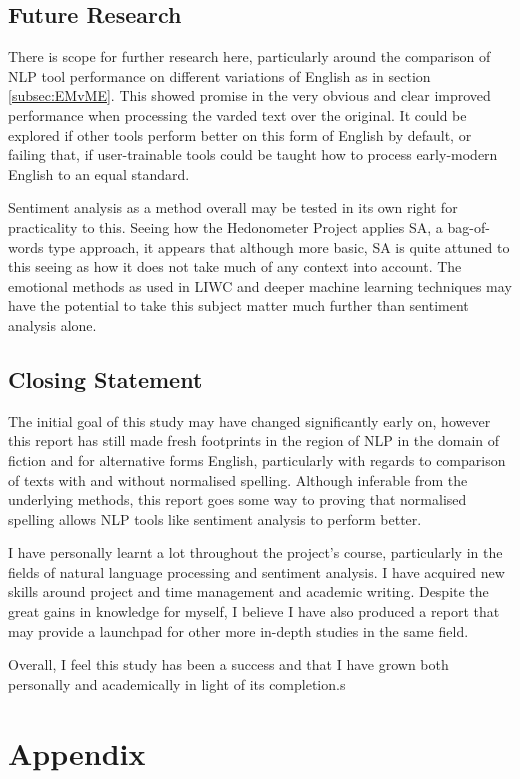 \documentclass{article}
\begin{document}
{    \subsection{Future Research}
        There is scope for further research here, particularly around the comparison of NLP tool performance on different variations of English as in section \ref{subsec:EMvME}. This showed promise in the very obvious and clear improved performance when processing the varded text over the original. It could be explored if other tools perform better on this form of English by default, or failing that, if user-trainable tools could be taught how to process early-modern English to an equal standard.

        Sentiment analysis as a method overall may be tested in its own right for practicality to this. Seeing how the Hedonometer Project applies SA, a bag-of-words type approach, it appears that although more basic, SA is quite attuned to this seeing as how it does not take much of any context into account. The emotional methods as used in LIWC and deeper machine learning techniques may have the potential to take this subject matter much further than sentiment analysis alone.
    \subsection{Closing Statement}
        The initial goal of this study may have changed significantly early on, however this report has still made fresh footprints in the region of NLP in the domain of fiction and for alternative forms English, particularly with regards to comparison of texts with and without normalised spelling. Although inferable from the underlying methods, this report goes some way to proving that normalised spelling allows NLP tools like sentiment analysis to perform better.

        I have personally learnt a lot throughout the project's course, particularly in the fields of natural language processing and sentiment analysis. I have acquired new skills around project and time management and academic writing. Despite the great gains in knowledge for myself, I believe I have also produced a report that may provide a launchpad for other more in-depth studies in the same field.
        
        Overall, I feel this study has been a success and that I have grown both personally and academically in light of its completion.s
\label{sec:conclusion}
\newpage

\newpage
\section*{Appendix}
}
\end{document}
